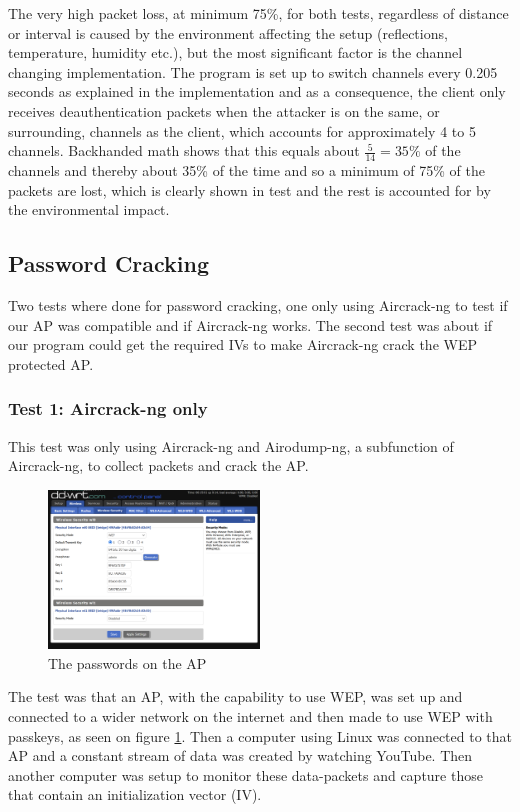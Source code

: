 The very high packet loss, at minimum 75\%, for both tests, regardless of distance or interval is caused by the environment affecting the setup (reflections, temperature, humidity etc.), but the most significant factor is the channel changing implementation. The program is set up to switch channels every 0.205 seconds as explained in the implementation and as a consequence, the client only receives deauthentication packets when the attacker is on the same, or surrounding, channels as the client, which accounts for approximately 4 to 5 channels. Backhanded math shows that this equals about $\frac{5}{14} = 35\%$ of the channels and thereby about 35\% of the time and so a minimum of 75\% of the packets are lost, which is clearly shown in test and the rest is accounted for by the environmental impact.

\subsection{Password Cracking}
Two tests where done for password cracking, one only using Aircrack-ng to test if our AP was compatible and if Aircrack-ng works. The second test was about if our program could get the required IVs to make Aircrack-ng crack the WEP protected AP.

\subsubsection{Test 1: Aircrack-ng only}

This test was only using Aircrack-ng and Airodump-ng, a subfunction of Aircrack-ng, to collect packets and crack the AP.

\begin{figure}[!htbp]
    \centering
    \includegraphics[width=0.5\textwidth]{Latex-Files/Billeder/Kode2.png}
    \caption{The passwords on the AP}
    \label{Crack2}
\end{figure}

The test was that an AP, with the capability to use WEP, was set up and connected to a wider network on the internet and then made to use WEP with passkeys, as seen on figure \ref{Crack2}. Then a computer using Linux was connected to that AP and a constant stream of data was created by watching YouTube. Then another computer was setup to monitor these data-packets and capture those that contain an initialization vector (IV). 

